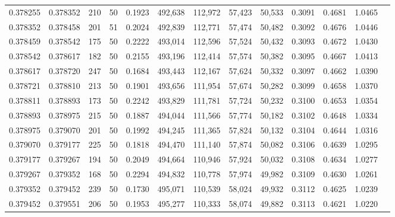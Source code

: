 \begin{tabular}{rrrrrrrrrrrrr}
0.378255 & 0.378352 &   210 &  50 &                                     0.1923 & 492,638 & 112,972 &  57,423 &  50,533 & 0.3091 & 0.4681 & 1.0465 \\
0.378352 & 0.378458 &   201 &  51 &                                     0.2024 & 492,839 & 112,771 &  57,474 &  50,482 & 0.3092 & 0.4676 & 1.0446 \\
0.378459 & 0.378542 &   175 &  50 &                                     0.2222 & 493,014 & 112,596 &  57,524 &  50,432 & 0.3093 & 0.4672 & 1.0430 \\
0.378542 & 0.378617 &   182 &  50 &                                     0.2155 & 493,196 & 112,414 &  57,574 &  50,382 & 0.3095 & 0.4667 & 1.0413 \\
0.378617 & 0.378720 &   247 &  50 &                                     0.1684 & 493,443 & 112,167 &  57,624 &  50,332 & 0.3097 & 0.4662 & 1.0390 \\
0.378721 & 0.378810 &   213 &  50 &                                     0.1901 & 493,656 & 111,954 &  57,674 &  50,282 & 0.3099 & 0.4658 & 1.0370 \\
0.378811 & 0.378893 &   173 &  50 &                                     0.2242 & 493,829 & 111,781 &  57,724 &  50,232 & 0.3100 & 0.4653 & 1.0354 \\
0.378893 & 0.378975 &   215 &  50 &                                     0.1887 & 494,044 & 111,566 &  57,774 &  50,182 & 0.3102 & 0.4648 & 1.0334 \\
0.378975 & 0.379070 &   201 &  50 &                                     0.1992 & 494,245 & 111,365 &  57,824 &  50,132 & 0.3104 & 0.4644 & 1.0316 \\
0.379070 & 0.379177 &   225 &  50 &                                     0.1818 & 494,470 & 111,140 &  57,874 &  50,082 & 0.3106 & 0.4639 & 1.0295 \\
0.379177 & 0.379267 &   194 &  50 &                                     0.2049 & 494,664 & 110,946 &  57,924 &  50,032 & 0.3108 & 0.4634 & 1.0277 \\
0.379267 & 0.379352 &   168 &  50 &                                     0.2294 & 494,832 & 110,778 &  57,974 &  49,982 & 0.3109 & 0.4630 & 1.0261 \\
0.379352 & 0.379452 &   239 &  50 &                                     0.1730 & 495,071 & 110,539 &  58,024 &  49,932 & 0.3112 & 0.4625 & 1.0239 \\
0.379452 & 0.379551 &   206 &  50 &                                     0.1953 & 495,277 & 110,333 &  58,074 &  49,882 & 0.3113 & 0.4621 & 1.0220 \\

\end{tabular}
